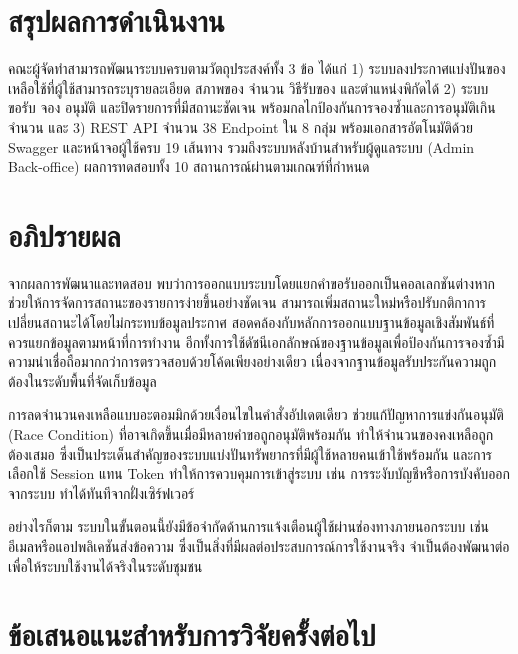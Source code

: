 \documentclass[12pt,a4paper]{report}
\begin{document}
\section{สรุปผลการดำเนินงาน}

คณะผู้จัดทำสามารถพัฒนาระบบครบตามวัตถุประสงค์ทั้ง 3 ข้อ ได้แก่ 1) ระบบลงประกาศแบ่งปันของเหลือใช้ที่ผู้ใช้สามารถระบุรายละเอียด สภาพของ จำนวน วิธีรับของ และตำแหน่งพิกัดได้ 2) ระบบขอรับ จอง อนุมัติ และปิดรายการที่มีสถานะชัดเจน พร้อมกลไกป้องกันการจองซ้ำและการอนุมัติเกินจำนวน และ 3) REST API จำนวน 38 Endpoint ใน 8 กลุ่ม พร้อมเอกสารอัตโนมัติด้วย Swagger และหน้าจอผู้ใช้ครบ 19 เส้นทาง รวมถึงระบบหลังบ้านสำหรับผู้ดูแลระบบ (Admin Back-office) ผลการทดสอบทั้ง 10 สถานการณ์ผ่านตามเกณฑ์ที่กำหนด

\section{อภิปรายผล}

จากผลการพัฒนาและทดสอบ พบว่าการออกแบบระบบโดยแยกคำขอรับออกเป็นคอลเลกชันต่างหากช่วยให้การจัดการสถานะของรายการง่ายขึ้นอย่างชัดเจน สามารถเพิ่มสถานะใหม่หรือปรับกติกาการเปลี่ยนสถานะได้โดยไม่กระทบข้อมูลประกาศ สอดคล้องกับหลักการออกแบบฐานข้อมูลเชิงสัมพันธ์ที่ควรแยกข้อมูลตามหน้าที่การทำงาน อีกทั้งการใช้ดัชนีเอกลักษณ์ของฐานข้อมูลเพื่อป้องกันการจองซ้ำมีความน่าเชื่อถือมากกว่าการตรวจสอบด้วยโค้ดเพียงอย่างเดียว เนื่องจากฐานข้อมูลรับประกันความถูกต้องในระดับพื้นที่จัดเก็บข้อมูล

\vspace{0.4em}

การลดจำนวนคงเหลือแบบอะตอมมิกด้วยเงื่อนไขในคำสั่งอัปเดตเดียว ช่วยแก้ปัญหาการแข่งกันอนุมัติ (Race Condition) ที่อาจเกิดขึ้นเมื่อมีหลายคำขอถูกอนุมัติพร้อมกัน ทำให้จำนวนของคงเหลือถูกต้องเสมอ ซึ่งเป็นประเด็นสำคัญของระบบแบ่งปันทรัพยากรที่มีผู้ใช้หลายคนเข้าใช้พร้อมกัน และการเลือกใช้ Session แทน Token ทำให้การควบคุมการเข้าสู่ระบบ เช่น การระงับบัญชีหรือการบังคับออกจากระบบ ทำได้ทันทีจากฝั่งเซิร์ฟเวอร์

\vspace{0.4em}

อย่างไรก็ตาม ระบบในขั้นตอนนี้ยังมีข้อจำกัดด้านการแจ้งเตือนผู้ใช้ผ่านช่องทางภายนอกระบบ เช่น อีเมลหรือแอปพลิเคชันส่งข้อความ ซึ่งเป็นสิ่งที่มีผลต่อประสบการณ์การใช้งานจริง จำเป็นต้องพัฒนาต่อเพื่อให้ระบบใช้งานได้จริงในระดับชุมชน

\section{ข้อเสนอแนะสำหรับการวิจัยครั้งต่อไป}
\end{document}
